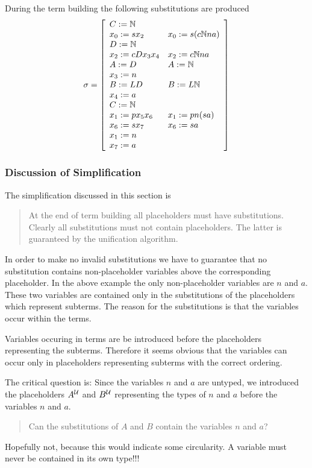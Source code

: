 During the term building the following substitutions are produced
$$
\sigma = \left[
\begin{array}{ll}
  C:={\mathbb{N}}
  \\ x_0:= s x_2      & x_0 := s (c {\mathbb{N}} n a)
  \\ D:={\mathbb{N}}
  \\ x_2:=c D x_3 x_4 & x_2 := c {\mathbb{N}} n a
  \\ A := D           & A := {\mathbb{N}}
  \\ x_3 := n
  \\ B := L D         & B := L {\mathbb{N}}
  \\ x_4 := a
  \\ C := {\mathbb{N}}
  \\ x_1 := p x_5 x_6 & x_1 := p n (s a)
  \\ x_6 := s x_7     & x_6 := s a
  \\ x_1 := n
  \\ x_7 := a
\end{array}
\right]
$$



\subsubsection{Discussion of Simplification}


The simplification discussed in this section is
\begin{quote}
  At the end of term building all placeholders must have
  substitutions. Clearly all substitutions must not contain placeholders. The
  latter is guaranteed by the unification algorithm.
\end{quote}

In order to make no invalid substitutions we have to guarantee that no
substitution contains non-placeholder variables above the corresponding
placeholder. In the above example the only non-placeholder variables are $n$
and $a$. These two variables are contained only in the substitutions of the
placeholders which represent subterms. The reason for the substitutions is
that the variables occur within the terms.

Variables occuring in terms are be introduced before the placeholders
representing the subterms. Therefore it seems obvious that the variables can
occur only in placeholders representing subterms with the correct ordering.

The critical question is: Since the variables $n$ and $a$ are untyped, we
introduced the placeholders $A^{\cal{U}}$ and $B^{\cal{U}}$ representing the types of
$n$ and $a$ before the variables $n$ and $a$.
\begin{quote}
  Can the substitutions of $A$ and $B$ contain the variables $n$ and $a$?
\end{quote}
Hopefully not, because this would indicate some circularity. A variable must
never be contained in its own type!!!

